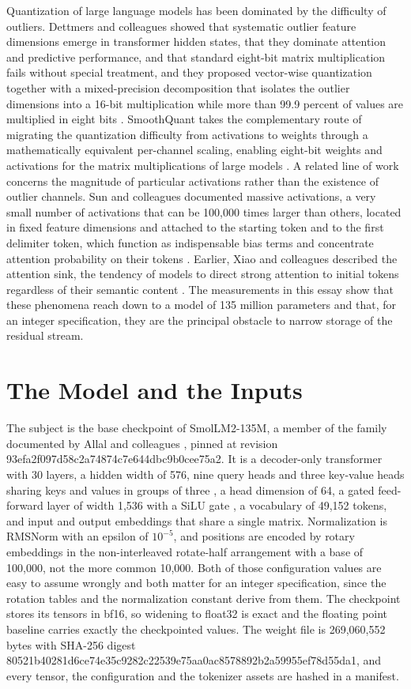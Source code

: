 \documentclass[11pt]{article}
\begin{document}
Quantization of large language models has been dominated by the difficulty of outliers. Dettmers and colleagues showed that systematic outlier feature dimensions emerge in transformer hidden states, that they dominate attention and predictive performance, and that standard eight-bit matrix multiplication fails without special treatment, and they proposed vector-wise quantization together with a mixed-precision decomposition that isolates the outlier dimensions into a 16-bit multiplication while more than 99.9 percent of values are multiplied in eight bits \cite{dettmers2022}. SmoothQuant takes the complementary route of migrating the quantization difficulty from activations to weights through a mathematically equivalent per-channel scaling, enabling eight-bit weights and activations for the matrix multiplications of large models \cite{xiao2023smooth}. A related line of work concerns the magnitude of particular activations rather than the existence of outlier channels. Sun and colleagues documented massive activations, a very small number of activations that can be 100,000 times larger than others, located in fixed feature dimensions and attached to the starting token and to the first delimiter token, which function as indispensable bias terms and concentrate attention probability on their tokens \cite{sun2024}. Earlier, Xiao and colleagues described the attention sink, the tendency of models to direct strong attention to initial tokens regardless of their semantic content \cite{xiao2024stream}. The measurements in this essay show that these phenomena reach down to a model of 135 million parameters and that, for an integer specification, they are the principal obstacle to narrow storage of the residual stream.

\section{The Model and the Inputs}

The subject is the base checkpoint of SmolLM2-135M, a member of the family documented by Allal and colleagues \cite{allal2025}, pinned at revision 93efa2f097d58c2a74874c7e644dbc9b0cee75a2. It is a decoder-only transformer with 30 layers, a hidden width of 576, nine query heads and three key-value heads sharing keys and values in groups of three \cite{ainslie2023}, a head dimension of 64, a gated feed-forward layer of width 1,536 with a SiLU gate \cite{shazeer2020}, a vocabulary of 49,152 tokens, and input and output embeddings that share a single matrix. Normalization is RMSNorm \cite{zhang2019} with an epsilon of $10^{-5}$, and positions are encoded by rotary embeddings \cite{su2024} in the non-interleaved rotate-half arrangement with a base of 100,000, not the more common 10,000. Both of those configuration values are easy to assume wrongly and both matter for an integer specification, since the rotation tables and the normalization constant derive from them. The checkpoint stores its tensors in bf16, so widening to float32 is exact and the floating point baseline carries exactly the checkpointed values. The weight file is 269,060,552 bytes with SHA-256 digest 80521b40281d6ce74e35c9282c22539e75aa0ac8578892b2a59955ef78d55da1, and every tensor, the configuration and the tokenizer assets are hashed in a manifest.
\end{document}
